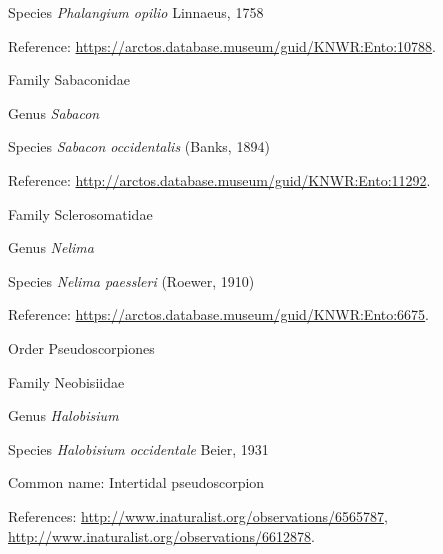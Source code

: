 \documentclass[9pt, article]{memoir}
\begin{document}
\begin{multicols}{2}
\vspace{6pt}\noindent\hspace{36pt}Species \textit{Phalangium opilio} Linnaeus, 1758


Reference: 
\url{https://arctos.database.museum/guid/KNWR:Ento:10788}.

\vspace{6pt}\noindent\hspace{24pt}Family Sabaconidae


\vspace{6pt}\noindent\hspace{30pt}Genus \textit{Sabacon}


\vspace{6pt}\noindent\hspace{36pt}Species \textit{Sabacon occidentalis} (Banks, 1894)


Reference: 
\url{http://arctos.database.museum/guid/KNWR:Ento:11292}.

\vspace{6pt}\noindent\hspace{24pt}Family Sclerosomatidae


\vspace{6pt}\noindent\hspace{30pt}Genus \textit{Nelima}


\vspace{6pt}\noindent\hspace{36pt}Species \textit{Nelima paessleri} (Roewer, 1910)


Reference: 
\url{https://arctos.database.museum/guid/KNWR:Ento:6675}.

\vspace{6pt}\noindent\hspace{18pt}Order Pseudoscorpiones


\vspace{6pt}\noindent\hspace{24pt}Family Neobisiidae


\vspace{6pt}\noindent\hspace{30pt}Genus \textit{Halobisium}


\vspace{6pt}\noindent\hspace{36pt}Species \textit{Halobisium occidentale} Beier, 1931


Common name: Intertidal pseudoscorpion

References: 
\url{http://www.inaturalist.org/observations/6565787}, 
\url{http://www.inaturalist.org/observations/6612878}.


\end{multicols}
\end{document}
